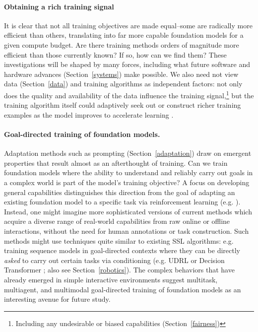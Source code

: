 \paragraph{Obtaining a rich training signal} It is clear that not all training objectives are made equal--some are radically more efficient than others, translating into far more capable foundation models for a given compute budget. Are there training methods orders of magnitude more efficient than those currently known? If so, how can we find them? These investigations will be shaped by many forces, including what future software and hardware advances (Section~\ref{systems}) make possible. We also need not view data (Section~\ref{data}) and training algorithms as independent factors: not only does the quality and availability of the data influence the training signal,\footnote{Including any undesirable or biased capabilities (Section~\ref{fairness})} but the training algorithm itself could adaptively seek out or construct richer training examples as the model improves to accelerate learning \citep{Tamkin2021ViewmakerNL}.

\paragraph{Goal-directed training of foundation models.} Adaptation methods such as prompting (Section~\ref{adaptation}) draw on emergent properties that result almost as an afterthought of training. Can we train foundation models where the ability to understand and reliably carry out goals in a complex world is part of the model's training objective? A focus on developing general capabilities distinguishes this direction from the goal of adapting an existing foundation model to a specific task via reinforcement learning (e.g. \citet{Stiennon2020LearningTS}). Instead, one might imagine more sophisticated versions of current methods which acquire a diverse range of real-world capabilities from raw online \citep{Klyubin2005EmpowermentAU, singh2005intrinsically, Salge2013EmpowermentA, Mohamed2015VariationalIM, Florensa2017StochasticNN, Pathak2017CuriosityDrivenEB, Haber2018LearningTP} or offline  \citep{Precup2000EligibilityTF, lange2012batch, Ajay2021OPALOP, Yang2021RepresentationMO, Schwarzer2021PretrainingRF} interactions, without the need for human annotations or task construction. Such methods might use techniques quite similar to existing SSL algorithms: e.g. training sequence models in goal-directed contexts where they can be directly \textit{asked} to carry out certain tasks via conditioning (e.g. UDRL \citep{Schmidhuber2019ReinforcementLU, Srivastava2019TrainingAU} or Decision Transformer \citep{Chen2021DecisionTR}; also see Section~\ref{robotics}). The complex behaviors that have already emerged in simple interactive environments  \citep{Baker2020EmergentTU} suggest multitask, multiagent, and multimodal goal-directed training of foundation models as an interesting avenue for future study.

